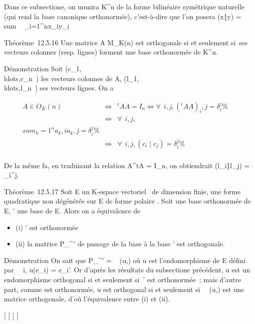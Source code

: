 \documentclass[]{article}
\begin{document}
Dans ce subsectione, on munira K^n de la forme bilinéaire
symétrique naturelle (qui rend la base canonique orthonormée),
c'est-à-dire que l'on posera (x∣y)
= \\sum ~
_i=1^nx_iy_i

Théorème~12.5.16 Une matrice A \in M_K(n) est orthogonale si et
seulement si~ses vecteurs colonnes (resp. lignes) forment une base
orthonormée de K^n.

Démonstration Soit
(c_1,\\ldots,c_n~)
les vecteurs colonnes de A,
(l_1,\\ldots,l_n~)
ses vecteurs lignes. On a

\begin{align*} A \in O_K(n)&
\Leftrightarrow & ^tAA = I_ n
\Leftrightarrow \forall~~i,j,
(^tAA)_ i,j = \delta_i^j\%&
\\ & \Leftrightarrow &
\forall~~i,j, \\sum
_k=1^na_ k,ia_k,j =
\delta_i^j \%& \\ &
\Leftrightarrow & \forall~~i,j,
(c_i∣c_j) =
\delta_i^j \%& \\
\end{align*}

De la même fa\ccon, en traduisant la relation
A^tA = I_n, on obtiendrait
(l_i∣l_j) =
\delta_i^j.

Théorème~12.5.17 Soit E un K-espace vectoriel ~de dimension finie, \Phi une
forme quadratique non dégénérée sur E de forme polaire \phi. Soit  une
base orthonormée de E, ' une base de E. Alors on a équivalence de

\begin{itemize}
\itemsep1pt\parskip0pt
\item
  (i) ' est orthonormée
\item
  (ii) la matrice P_^' de passage de la base  à la
  base ' est orthogonale.
\end{itemize}

Démonstration On sait que P_^'
= \mathrmMat~ (u,) où u est
l'endomorphisme de E défini par \forall~~i,
u(e_i) = e_i'. Or d'après les résultats du subsectione
précédent, u est un endomorphisme orthogonal si et seulement si~' est
orthonormée~; mais d'autre part, comme  est orthonormée, u est
orthogonal si et seulement
si~\mathrmMat~ (u,) est une
matrice orthogonale, d'où l'équivalence entre (i) et (ii).

[
[
[
[
\end{document}
